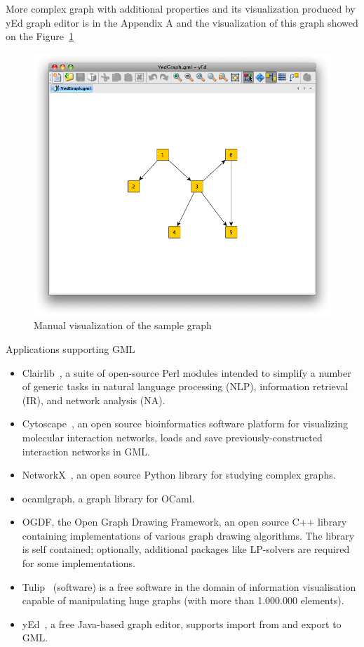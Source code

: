\documentclass[a4paper,oneside]{article}
\begin{document}
More complex graph with additional properties and its visualization produced by yEd graph editor is in the Appendix A and the visualization of this graph showed on the Figure~\ref{yed_graph_vis}

\begin{center}
\begin{figure}
	\includegraphics[scale=0.5]{pictures/YedGraph.png}
	\caption{Manual visualization of the sample graph}
	\label{yed_graph_vis}
\end{figure}
\end{center}

Applications supporting GML~\cite{GML_wiki}

\begin{itemize}
\item Clairlib~\cite{clairlib}, a suite of open-source Perl modules intended to simplify a number of generic tasks in natural language processing (NLP), information retrieval (IR), and network analysis (NA).
\item Cytoscape~\cite{Cytoscape}, an open source bioinformatics software platform for visualizing molecular interaction networks, loads and save previously-constructed interaction networks in GML.
\item NetworkX~\cite{NetworkX}, an open source Python library for studying complex graphs.
\item ocamlgraph\cite{ocamlgraph}, a graph library for OCaml.
\item OGDF\cite{OGDF}, the Open Graph Drawing Framework, an open source C++ library containing implementations of various graph drawing algorithms. The library is self contained; optionally, additional packages like LP-solvers are required for some implementations.
\item Tulip~\cite{Tulip} (software) is a free software in the domain of information visualisation capable of manipulating huge graphs (with more than 1.000.000 elements).
\item yEd~\cite{yEd}, a free Java-based graph editor, supports import from and export to GML.
\end{itemize}
\end{document}
